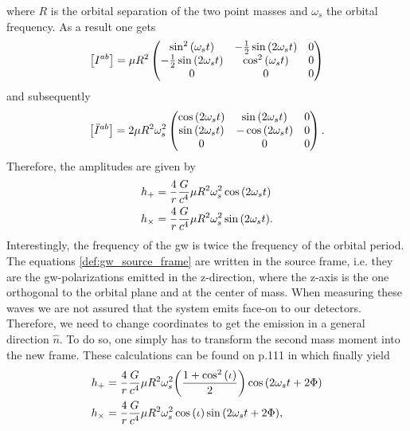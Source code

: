 where $R$ is the orbital separation of the two point masses and $\omega_s$ the orbital frequency. As a result one gets
\begin{equation}\label{def:binary_system_second_mass_moment}
\left[ I^{ab}\right] = \mu R^2\begin{pmatrix}
		\sin^2{\left( \omega_s t \right)} & -\frac{1}{2}\sin{\left( 2\omega_s t \right)} & 0\\
		-\frac{1}{2}\sin{\left( 2\omega_s t \right)} & \cos^2{\left( \omega_s t \right)} & 0\\
		0 & 0 & 0
	\end{pmatrix}
\end{equation}
and subsequently
\begin{equation}\label{def:binary_system_second_mass_moment_time_derivative}
\left[ \ddot{I}^{ab}\right] = 2 \mu R^2\omega_s^2
	\begin{pmatrix}
		\cos{\left( 2\omega_s t \right)} & \sin{\left( 2\omega_s t \right)} & 0\\
		\sin{\left( 2\omega_s t \right)} & -\cos{\left( 2\omega_s t \right)} & 0\\
		0 & 0 & 0
	\end{pmatrix}.
\end{equation}
Therefore, the amplitudes are given by
\begin{align}\label{def:gw_source_frame}
h_+ &= \frac{4}{r}\frac{G}{c^4}\mu R^2 \omega_s^2\cos{\left( 2\omega_s t \right)}\nonumber\\
h_\times &= \frac{4}{r}\frac{G}{c^4}\mu R^2 \omega_s^2\sin{\left( 2\omega_s t \right)}.
\end{align}
Interestingly, the frequency of the \gls{gw} is twice the frequency of the orbital period.\\
The equations \eqref{def:gw_source_frame} are written in the source frame, i.e. they are the \gls{gw}-polarizations emitted in the z-direction, where the z-axis is the one orthogonal to the orbital plane and at the center of mass. When measuring these waves we are not assured that the system emits face-on to our detectors. Therefore, we need to change coordinates to get the emission in a general direction $\hat{n}$. To do so, one simply has to transform the second mass moment into the new frame. These calculations can be found on p.111 in \cite{gwv1} which finally yield
\begin{align}\label{def:gw_travel_direction}
h_+ &= \frac{4}{r}\frac{G}{c^4}\mu R^2 \omega_s^2{\left( \frac{1+\cos^2{\left( \iota \right)}}{2} \right)}\cos{\left( 2\omega_s t+2\Phi \right)}\nonumber\\
h_\times &= \frac{4}{r}\frac{G}{c^4}\mu R^2 \omega_s^2\cos{\left( \iota \right)}\sin{\left( 2\omega_s t+2\Phi \right)},
\end{align}
